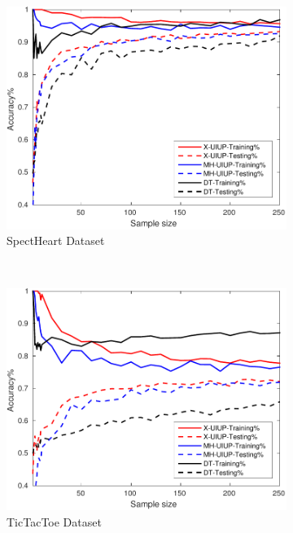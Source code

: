 \begin{figure}[ht]
\begin{subfigure}[b]{0.3\textwidth}
		\centering
  	\includegraphics[width=\textwidth]{figs/PLPTF/Trees/SpectHeartDownsampledFurther_Trees_X_MH.pdf}
  	\caption{SpectHeart Dataset}
		\label{fig:S1}
	\end{subfigure}
  \\
  \begin{subfigure}[b]{0.3\textwidth}
		\centering
  	\includegraphics[width=\textwidth]{figs/PLPTF/Trees/TicTacToe_Trees_X_MH.pdf}
  	\caption{TicTacToe Dataset}
		\label{fig:T1}
	\end{subfigure}
  \begin{subfigure}[b]{0.3\textwidth}
		\centering

\end{subfigure}
\end{figure}
